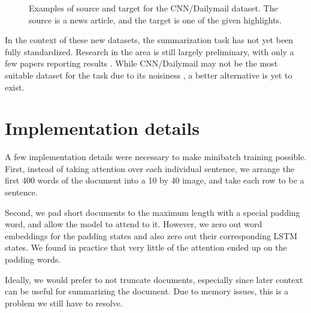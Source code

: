 \documentclass[12pt]{report}
\begin{document}
\begin{figure}
\caption{Examples of source and target for the CNN/Dailymail dataset. The source is a news article, and the target is one of the given highlights.}
\label{fig:data_examples}
\end{figure}

In the context of these new datasets, the summarization task has not yet been fully standardized. Research in the area is still largely preliminary, with only a few papers reporting results \citep[][e.g.]{nallapati2016seq2seq}. While CNN/Dailymail may not be the most suitable dataset for the task due to its noisiness \citep{Chen2016}, a better alternative is yet to exist.



%

\section{Implementation details}

A few implementation details were necessary to make minibatch training possible. First, instead of taking attention over each individual sentence, we arrange the first 400 words of the document into a 10 by 40 image, and take each row to be a sentence.

Second, we pad short documents to the maximum length with a special padding word, and allow the model to attend to it. However, we zero out word embeddings for the padding states and also zero out their corresponding LSTM states. We found in practice that very little of the attention ended up on the padding words.

Ideally, we would prefer to not truncate documents, especially since later context can be useful for summarizing the document. Due to memory issues, this is a problem we still have to resolve.
\end{document}
